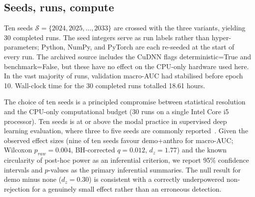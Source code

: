 \documentclass[mathematics,article,submit,pdftex]{Definitions/mdpi}
\def\texttt#1{#1}%
\def\mathrm#1{#1}%
\begin{document}
\subsection{Seeds, runs, compute}
Ten seeds $\mathcal{S} = \{2024, 2025, \ldots, 2033\}$ are crossed with the three variants, yielding 30 completed runs. The seed integers serve as run labels rather than hyper-parameters; Python, NumPy, and PyTorch are each re-seeded at the start of every run. The archived source includes the CuDNN flags \texttt{deterministic=True} and \texttt{benchmark=False}, but these have no effect on the CPU-only hardware used here. In the vast majority of runs, validation macro-AUC had stabilised before epoch 10. Wall-clock time for the 30 completed runs totalled 18.61 hours.

The choice of ten seeds is a principled compromise between statistical resolution and the CPU-only computational budget (30 runs on a single Intel Core i5 processor). Ten seeds is at or above the modal practice in supervised deep learning evaluation, where three to five seeds are commonly reported~\cite{Bouthillier2021,Dodge2019}. Given the observed effect sizes (nine of ten seeds favour \texttt{demo+anthro} for macro-AUC; Wilcoxon $p_{\mathrm{raw}}{=}0.004$, BH-corrected $q{=}0.012$, $d_{\mathrm{z}}{=}1.77$) and the known circularity of post-hoc power as an inferential criterion, we report 95\% confidence intervals and $p$-values as the primary inferential summaries. The null result for \texttt{demo} minus \texttt{none} ($d_{\mathrm{z}}{=}0.30$) is consistent with a correctly underpowered non-rejection for a genuinely small effect rather than an erroneous detection.
\end{document}
